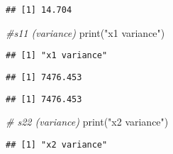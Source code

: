 \documentclass[
]{article}
\newenvironment{Shaded}{\begin{snugshade}}{\end{snugshade}}
\newcommand{\CommentTok}[1]{\textcolor[rgb]{0.56,0.35,0.01}{\textit{#1}}}
\newcommand{\FunctionTok}[1]{\textcolor[rgb]{0.00,0.00,0.00}{#1}}
\newcommand{\NormalTok}[1]{#1}
\newcommand{\SpecialCharTok}[1]{\textcolor[rgb]{0.00,0.00,0.00}{#1}}
\newcommand{\StringTok}[1]{\textcolor[rgb]{0.31,0.60,0.02}{#1}}
\begin{document}
\begin{verbatim}
## [1] 14.704
\end{verbatim}

\begin{Shaded}
\begin{Highlighting}[]
\CommentTok{\#s11 (variance)}
\FunctionTok{print}\NormalTok{(}\StringTok{"x1 variance"}\NormalTok{)}
\end{Highlighting}
\end{Shaded}

\begin{verbatim}
## [1] "x1 variance"
\end{verbatim}

\begin{Shaded}
\end{Shaded}

\begin{verbatim}
## [1] 7476.453
\end{verbatim}

\begin{Shaded}
\end{Shaded}

\begin{verbatim}
## [1] 7476.453
\end{verbatim}

\begin{Shaded}
\begin{Highlighting}[]
\CommentTok{\# s22 (variance)}
\FunctionTok{print}\NormalTok{(}\StringTok{"x2 variance"}\NormalTok{)}
\end{Highlighting}
\end{Shaded}

\begin{verbatim}
## [1] "x2 variance"
\end{verbatim}

\begin{Shaded}
\end{Shaded}
\end{document}
